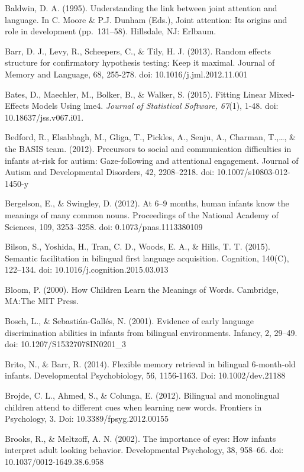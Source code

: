\documentclass[,man,floatsintext]{apa6}
\begin{document}
Baldwin, D. A. (1995). Understanding the link between joint attention and language. In C. Moore \& P.J. Dunham (Eds.), Joint attention: Its origins and role in development (pp.~131--58). Hillsdale, NJ: Erlbaum.

Barr, D. J., Levy, R., Scheepers, C., \& Tily, H. J. (2013). Random effects structure for confirmatory hypothesis testing: Keep it maximal. Journal of Memory and Language, 68, 255-278. doi: 10.1016/j.jml.2012.11.001

Bates, D., Maechler, M., Bolker, B., \& Walker, S. (2015). Fitting Linear Mixed-Effects Models Using lme4. \emph{Journal of Statistical Software, 67}(1), 1-48. doi: 10.18637/jss.v067.i01.

Bedford, R., Elsabbagh, M., Gliga, T., Pickles, A., Senju, A., Charman, T.,\ldots{}, \& the BASIS team. (2012). Precursors to social and communication difficulties in infants at-risk for autism: Gaze-following and attentional engagement. Journal of Autism and Developmental Disorders, 42, 2208--2218. doi: 10.1007/s10803-012-1450-y

Bergelson, E., \& Swingley, D. (2012). At 6--9 months, human infants know the meanings of many common nouns. Proceedings of the National Academy of Sciences, 109, 3253--3258. doi: 0.1073/pnas.1113380109

Bilson, S., Yoshida, H., Tran, C. D., Woods, E. A., \& Hills, T. T. (2015). Semantic facilitation in bilingual first language acquisition. Cognition, 140(C), 122--134. doi: 10.1016/j.cognition.2015.03.013

Bloom, P. (2000). How Children Learn the Meanings of Words. Cambridge, MA:The MIT Press.

Bosch, L., \& Sebastián-Gallés, N. (2001). Evidence of early language discrimination abilities in infants from bilingual environments. Infancy, 2, 29--49. doi: 10.1207/S15327078IN0201\_3

Brito, N., \& Barr, R. (2014). Flexible memory retrieval in bilingual 6-month-old infants. Developmental Psychobiology, 56, 1156-1163. Doi: 10.1002/dev.21188

Brojde, C. L., Ahmed, S., \& Colunga, E. (2012). Bilingual and monolingual children attend to different cues when learning new words. Frontiers in Psychology, 3. Doi: 10.3389/fpsyg.2012.00155

Brooks, R., \& Meltzoff, A. N. (2002). The importance of eyes: How infants interpret adult looking behavior. Developmental Psychology, 38, 958--66. doi: 10.1037/0012-1649.38.6.958
\end{document}
